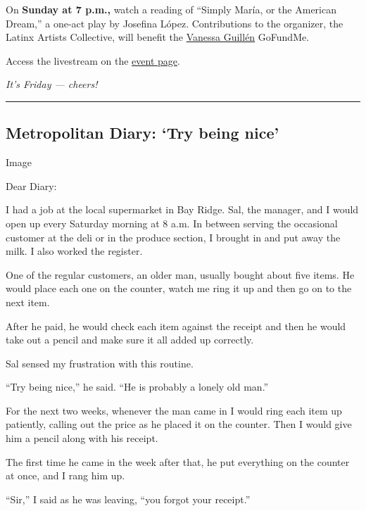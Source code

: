 On \textbf{Sunday at 7 p.m.,} watch a reading of ``Simply María, or the
American Dream,'' a one-act play by Josefina López. Contributions to the
organizer, the Latinx Artists Collective, will benefit the
\href{https://www.nytimes3xbfgragh.onion/article/vanessa-guillen-fort-hood.html}{Vanessa
Guillén} GoFundMe.

Access the livestream on the
\href{https://www.eventbrite.com/e/lac-presents-a-zoom-play-reading-of-simply-maria-or-the-american-dream-registration-114761127622}{event
page}.

\emph{It's Friday --- cheers!}

\begin{center}\rule{0.5\linewidth}{\linethickness}\end{center}

\hypertarget{metropolitan-diary-try-being-nice}{%
\subsection{Metropolitan Diary: `Try being
nice'}\label{metropolitan-diary-try-being-nice}}

Image

Dear Diary:

I had a job at the local supermarket in Bay Ridge. Sal, the manager, and
I would open up every Saturday morning at 8 a.m. In between serving the
occasional customer at the deli or in the produce section, I brought in
and put away the milk. I also worked the register.

One of the regular customers, an older man, usually bought about five
items. He would place each one on the counter, watch me ring it up and
then go on to the next item.

After he paid, he would check each item against the receipt and then he
would take out a pencil and make sure it all added up correctly.

Sal sensed my frustration with this routine.

``Try being nice,'' he said. ``He is probably a lonely old man.''

For the next two weeks, whenever the man came in I would ring each item
up patiently, calling out the price as he placed it on the counter. Then
I would give him a pencil along with his receipt.

The first time he came in the week after that, he put everything on the
counter at once, and I rang him up.

``Sir,'' I said as he was leaving, ``you forgot your receipt.''

